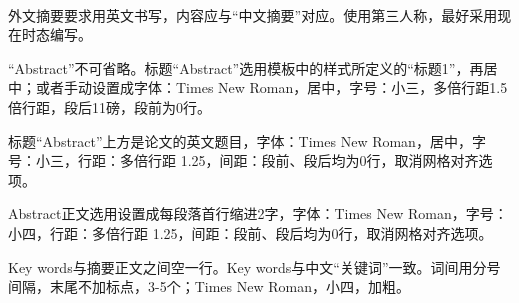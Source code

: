 \setlength{\baselineskip}{20pt}
\begin{japaneseabstract}
	\centerline{}\par
	~\par

	外文摘要要求用英文书写，内容应与“中文摘要”对应。使用第三人称，最好采用现在时态编写。\par
	“Abstract”不可省略。标题“Abstract”选用模板中的样式所定义的“标题1”，再居中；或者手动设置成字体：Times New Roman，居中，字号：小三，多倍行距1.5倍行距，段后11磅，段前为0行。\par
	标题“Abstract”上方是论文的英文题目，字体：Times New Roman，居中，字号：小三，行距：多倍行距 1.25，间距：段前、段后均为0行，取消网格对齐选项。\par
	Abstract正文选用设置成每段落首行缩进2字，字体：Times New Roman，字号：小四，行距：多倍行距 1.25，间距：段前、段后均为0行，取消网格对齐选项。\par
	Key words与摘要正文之间空一行。Key words与中文“关键词”一致。词间用分号间隔，末尾不加标点，3-5个；Times New Roman，小四，加粗。\par
	
	~\par
	\noindent{}

\end{japaneseabstract}